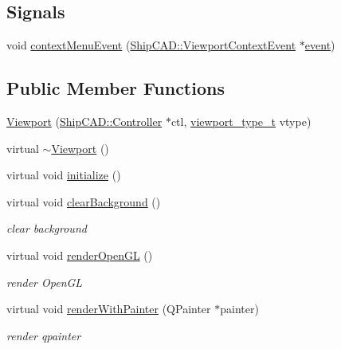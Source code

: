 \subsection*{Signals}
\begin{DoxyCompactItemize}
\item 
void \hyperlink{classShipCAD_1_1Viewport_a910ae7ca3acc3a55ae4920ed57305a01}{context\+Menu\+Event} (\hyperlink{classShipCAD_1_1ViewportContextEvent}{Ship\+C\+A\+D\+::\+Viewport\+Context\+Event} $\ast$\hyperlink{classOpenGLWindow_a1e3045cffb900de55b7384f5091c9d94}{event})
\end{DoxyCompactItemize}
\subsection*{Public Member Functions}
\begin{DoxyCompactItemize}
\item 
\hyperlink{classShipCAD_1_1Viewport_af6af98eae1040b82b047df5a679e891b}{Viewport} (\hyperlink{classShipCAD_1_1Controller}{Ship\+C\+A\+D\+::\+Controller} $\ast$ctl, \hyperlink{namespaceShipCAD_aeeeb05810f2e31ef89fd4ac6b6ba9c0a}{viewport\+\_\+type\+\_\+t} vtype)
\item 
virtual \hyperlink{classShipCAD_1_1Viewport_a1e18a1ff4a52be33ef63d25034561850}{$\sim$\+Viewport} ()
\item 
virtual void \hyperlink{classShipCAD_1_1Viewport_a9c35de3f7c9d7c860c494081b48309b3}{initialize} ()
\item 
virtual void \hyperlink{classShipCAD_1_1Viewport_ac0c02d6e3a0933669de2292f041c69e6}{clear\+Background} ()
\begin{DoxyCompactList}\small\item\em clear background \end{DoxyCompactList}\item 
virtual void \hyperlink{classShipCAD_1_1Viewport_ae1a93920fcaf1b6eaa46d390bbd15ce4}{render\+Open\+GL} ()
\begin{DoxyCompactList}\small\item\em render Open\+GL \end{DoxyCompactList}\item 
virtual void \hyperlink{classShipCAD_1_1Viewport_ad48bfa81c7034792f290ed47bac203c5}{render\+With\+Painter} (Q\+Painter $\ast$painter)
\begin{DoxyCompactList}\small\item\em render qpainter \end{DoxyCompactList}\item 

\end{DoxyCompactItemize}
